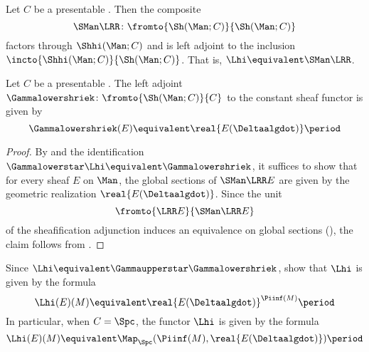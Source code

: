 \begin{corollary}\label{cor:hilowershriekasacomposite}
	Let $ C $ be a presentable \category.
	Then the composite
	\begin{equation*}
		\SMan \LRR \colon \fromto{\Sh(\Man;C)}{\Sh(\Man;C)}
	\end{equation*}
	factors through $ \Shhi(\Man;C) $ and is left adjoint to the inclusion $ \incto{\Shhi(\Man;C)}{\Sh(\Man;C)} $.
	That is, $ \Lhi \equivalent \SMan \LRR $.
\end{corollary}

\begin{corollary}\label{cor:Gammalowershriek}
	Let $ C $ be a presentable \category.
	The left adjoint $ \Gammalowershriek \colon \fromto{\Sh(\Man;C)}{C} $ to the constant sheaf functor is given by
	\begin{equation*}
		\Gammalowershriek(E) \equivalent \real{E(\Deltaalgdot)} \period
	\end{equation*}
\end{corollary}

\begin{proof}
	By  and the identification $ \Gammalowerstar \Lhi \equivalent \Gammalowershriek $, it suffices to show that for every sheaf $ E $ on $ \Man $, the global sections of $ \SMan \LRR E $ are given by the geometric realization $ \real{E(\Deltaalgdot)} $.
	Since the unit
	\begin{equation*}
		\fromto{\LRR E}{\SMan \LRR E}
	\end{equation*}
	of the sheafification adjunction induces an equivalence on global sections (), the claim follows from .
\end{proof}

\begin{nul}
	Since $ \Lhi \equivalent \Gammaupperstar \Gammalowershriek $,  show that $ \Lhi $ is given by the formula
	\begin{equation*}
		\Lhi(E)(M) \equivalent \real{E(\Deltaalgdot)}^{\Piinf(M)} \period
	\end{equation*}
	In particular, when $ C = \Spc $, the functor $ \Lhi $ is given by the formula
	\begin{equation*}
		\Lhi(E)(M) \equivalent \Map_{\Spc}(\Piinf(M),\real{E(\Deltaalgdot)}) \period
	\end{equation*}
\end{nul}

